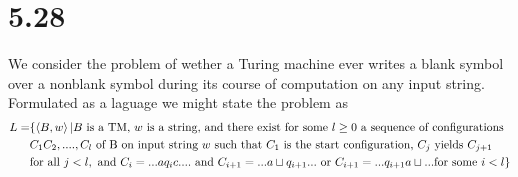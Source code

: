 \documentclass[a4paper,11pt]{article}
\numberwithin{equation}{section}
\begin{document}
\section*{5.28}
We consider the problem of wether a Turing machine ever writes a blank symbol over a nonblank symbol during its course of computation on any input string. Formulated as a laguage we might state the problem as \begin{equation*}
\begin{aligned}
L=&\{\braket{B,w} \vert B\text{ is a TM, $ w $ is a string, and there exist for some $ l\geq0 $ a sequence of configurations }\\ &C_1C_2,....,C_l\text{ of B on input string }w\text{ such that }C_1\text{ is the start configuration, }C_{j}\text{ yields }C_{j+1}\\&\text{for all }j< l,\text{ and }C_i=...aq_ic....\text{ and }C_{i+1}=...a\sqcup q_{i+1}... \text{ or }C_{i+1}=...q_{i+1}a\sqcup... \text{for some }i<l\}
\end{aligned}
\end{equation*}
\end{document}
